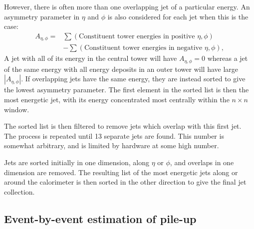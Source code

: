 However, there is often more than one overlapping jet of a particular energy. 
An asymmetry parameter in $\eta$ and $\phi$ is also considered for each jet when this is the case:
\begin{equation}
 \begin{split}
 A_{\eta, \phi} = & \sum \left( \text{Constituent tower energies in positive } \eta , \phi \right) \\ & - \sum \left( \text{Constituent tower energies in negative } \eta, \phi \right) ,
 \end{split}
\label{eqn:Asym}
\end{equation}
A jet with all of its energy in the central tower will have $A_{\eta, \phi} = 0$ 
whereas a jet of the same energy with all energy deposits in an outer tower
 will have large $|A_{\eta, \phi}|$. 
If overlapping jets have the same energy, they are instead sorted 
to give the lowest asymmetry parameter.
The first element in the sorted list is then the most energetic jet, with its energy concentrated most centrally within the $n\times n$ window.

 The sorted list is then filtered to remove jets which overlap with this first jet.
 The process is repeated until 13 separate jets are found. 
 This number is somewhat arbitrary, and is limited by hardware at some high number.
 
Jets are sorted initially in one dimension, along $\eta$ or $\phi$, and overlaps in one dimension are removed. 
The resulting list of the most energetic jets along or around the calorimeter is then sorted in the other direction to give the final jet collection.


\subsection{Event-by-event estimation of pile-up} 

